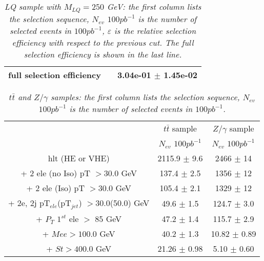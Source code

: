 \documentclass{cmspaper}
\begin{document}
\begin{linenumbers}
\begin{table}[htbp]
\begin{center}
\begin{tabular}{|c|c|c|}
full selection efficiency& & 3.04e-01 $\pm$ 1.45e-02\\
\hline
\end{tabular}
\end{center}
\caption{\small \sl LQ sample with $M_{LQ}=250$ GeV: the first column lists the selection sequence, $N_{ev}$ $100pb^{-1}$ is the number of selected events in $100pb^{-1}$, $\varepsilon$ is the relative selection efficiency with respect to the previous cut. The full selection efficiency is shown in the last line.}
\label{tab:selection_effic_250}
\end{table}



\begin{table}[htbp]
\begin{center}
\begin{tabular}{|c| |c|c|}
\hline
\hline
 & $t\bar{t}$ sample  & $Z/\gamma$ sample\\
 & $N_{ev}$ $100pb^{-1}$ & $N_{ev}$ $100pb^{-1}$ \\
  
\hline
\hline

hlt (HE or VHE) &2115.9 $\pm$ 9.6 & 2466 $\pm$ 14 \\
+ 2 ele (no Iso) pT $>30.0$ GeV &137.4 $\pm$ 2.5& 1356 $\pm$ 12 \\
+ 2 ele (Iso) pT $>30.0$ GeV &105.4 $\pm$ 2.1& 1329 $\pm$ 12  \\
+ 2e, 2j pT$_{ele}$(pT$_{jet}$) $>$30.0(50.0) GeV &49.6 $\pm$ 1.5& 124.7 $\pm$ 3.0\\
+ $P_{T}$ $1^{st}$ ele $>$ 85 GeV &47.2 $\pm$ 1.4& 115.7 $\pm$ 2.9\\
+ $Mee >100.0$ GeV&40.2 $\pm$ 1.3& 10.82 $\pm$ 0.89 \\
+ $St >400.0$ GeV &21.26 $\pm$ 0.98 & 5.10 $\pm$ 0.60 \\
\hline
\end{tabular}
\end{center}
\caption{\small \sl $t\bar{t}$ and $Z/\gamma$ samples: the first column lists the selection sequence, $N_{ev}$ $100pb^{-1}$ is the number of selected events in $100pb^{-1}$.}
\label{tab:selection_effic_ttbar}
\end{table}




\end{linenumbers}
\end{document}
